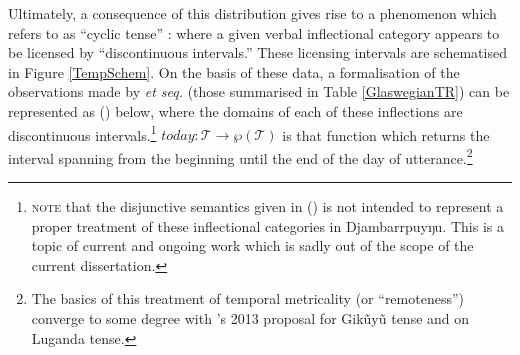 Ultimately, a consequence of this distribution gives rise to a phenomenon which \citet[83]{Comrie1985} refers to as ``cyclic tense'' : where a given verbal inflectional category appears to be licensed by ``discontinuous intervals.'' These licensing intervals are schematised in Figure \ref{TempSchem}. On the basis of these data, a formalisation of the observations made by \citealt{Glasgow1964} \textit{et seq.} (those summarised in Table \ref{GlaswegianTR}) can be represented as (\nextx) below, where the domains of each of these inflections are discontinuous intervals.\footnote{\textsc{note} that the disjunctive semantics given in () is not intended to represent a proper treatment of these inflectional categories in Djambarrpuyŋu. This is a topic of current and ongoing work which is sadly out of the scope of the current dissertation.} $ \textit{today}:\mathcal T\to\wp(\mathcal T) $ is that function which returns the interval spanning from the beginning until the end of the day of utterance.\footnote{The basics of this treatment of temporal metricality (or ``remoteness'') converge to some degree with \citeauthor{Cable2013}'s 2013 proposal for Gikũyũ tense and \citeauthor{Klecha2016} on Luganda tense.}




